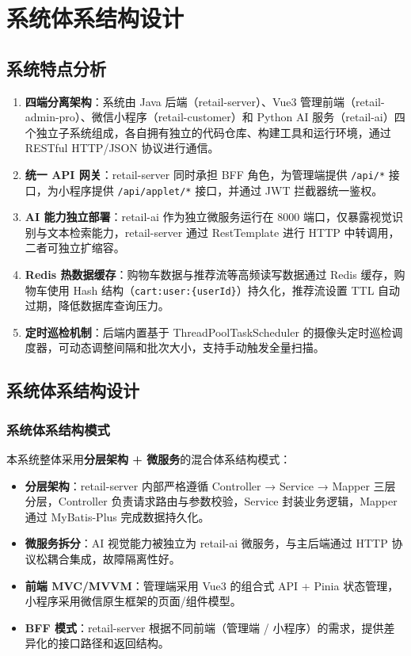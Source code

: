 \section{系统体系结构设计}

\subsection{系统特点分析}
\begin{enumerate}[leftmargin=2em]
  \item \textbf{四端分离架构}：系统由 Java 后端（retail-server）、Vue3 管理前端（retail-admin-pro）、微信小程序（retail-customer）和 Python AI 服务（retail-ai）四个独立子系统组成，各自拥有独立的代码仓库、构建工具和运行环境，通过 RESTful HTTP/JSON 协议进行通信。
  \item \textbf{统一 API 网关}：retail-server 同时承担 BFF 角色，为管理端提供 \texttt{/api/*} 接口，为小程序提供 \texttt{/api/applet/*} 接口，并通过 JWT 拦截器统一鉴权。
  \item \textbf{AI 能力独立部署}：retail-ai 作为独立微服务运行在 8000 端口，仅暴露视觉识别与文本检索能力，retail-server 通过 RestTemplate 进行 HTTP 中转调用，二者可独立扩缩容。
  \item \textbf{Redis 热数据缓存}：购物车数据与推荐流等高频读写数据通过 Redis 缓存，购物车使用 Hash 结构（\texttt{cart:user:\{userId\}}）持久化，推荐流设置 TTL 自动过期，降低数据库查询压力。
  \item \textbf{定时巡检机制}：后端内置基于 ThreadPoolTaskScheduler 的摄像头定时巡检调度器，可动态调整间隔和批次大小，支持手动触发全量扫描。
\end{enumerate}

\subsection{系统体系结构设计}

\subsubsection{系统体系结构模式}
本系统整体采用\textbf{分层架构 + 微服务}的混合体系结构模式：
\begin{itemize}[leftmargin=2em]
  \item \textbf{分层架构}：retail-server 内部严格遵循 Controller → Service → Mapper 三层分层，Controller 负责请求路由与参数校验，Service 封装业务逻辑，Mapper 通过 MyBatis-Plus 完成数据持久化。
  \item \textbf{微服务拆分}：AI 视觉能力被独立为 retail-ai 微服务，与主后端通过 HTTP 协议松耦合集成，故障隔离性好。
  \item \textbf{前端 MVC/MVVM}：管理端采用 Vue3 的组合式 API + Pinia 状态管理，小程序采用微信原生框架的页面/组件模型。
  \item \textbf{BFF 模式}：retail-server 根据不同前端（管理端 / 小程序）的需求，提供差异化的接口路径和返回结构。
\end{itemize}

